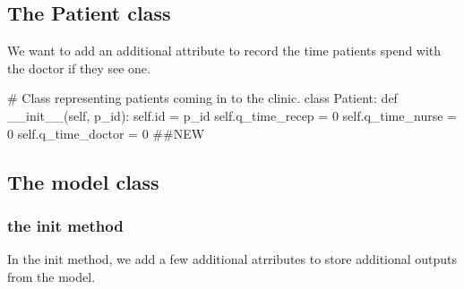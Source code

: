 \documentclass[
  letterpaper,
  DIV=11,
  numbers=noendperiod]{scrreprt}
\newenvironment{Shaded}{\begin{snugshade}}{\end{snugshade}}
\newcommand{\BuiltInTok}[1]{\textcolor[rgb]{0.00,0.23,0.31}{#1}}
\newcommand{\CommentTok}[1]{\textcolor[rgb]{0.37,0.37,0.37}{#1}}
\newcommand{\DecValTok}[1]{\textcolor[rgb]{0.68,0.00,0.00}{#1}}
\newcommand{\FunctionTok}[1]{\textcolor[rgb]{0.28,0.35,0.67}{#1}}
\newcommand{\KeywordTok}[1]{\textcolor[rgb]{0.00,0.23,0.31}{#1}}
\newcommand{\NormalTok}[1]{\textcolor[rgb]{0.00,0.23,0.31}{#1}}
\newcommand{\OperatorTok}[1]{\textcolor[rgb]{0.37,0.37,0.37}{#1}}
\newcommand{\VariableTok}[1]{\textcolor[rgb]{0.07,0.07,0.07}{#1}}
\begin{document}
\subsection{The Patient class}\label{the-patient-class-1}

We want to add an additional attribute to record the time patients spend
with the doctor if they see one.

\begin{Shaded}
\begin{Highlighting}[]
\CommentTok{\# Class representing patients coming in to the clinic.}
\KeywordTok{class}\NormalTok{ Patient:}
    \KeywordTok{def} \FunctionTok{\_\_init\_\_}\NormalTok{(}\VariableTok{self}\NormalTok{, p\_id):}
        \VariableTok{self}\NormalTok{.}\BuiltInTok{id} \OperatorTok{=}\NormalTok{ p\_id}
        \VariableTok{self}\NormalTok{.q\_time\_recep }\OperatorTok{=} \DecValTok{0}
        \VariableTok{self}\NormalTok{.q\_time\_nurse }\OperatorTok{=} \DecValTok{0}
        \VariableTok{self}\NormalTok{.q\_time\_doctor }\OperatorTok{=} \DecValTok{0} \CommentTok{\#\#NEW}
\end{Highlighting}
\end{Shaded}

\subsection{The model class}\label{the-model-class-1}

\subsubsection{\texorpdfstring{the \textbf{init}
method}{the init method}}\label{the-init-method}

In the init method, we add a few additional atrributes to store
additional outputs from the model.
\end{document}
